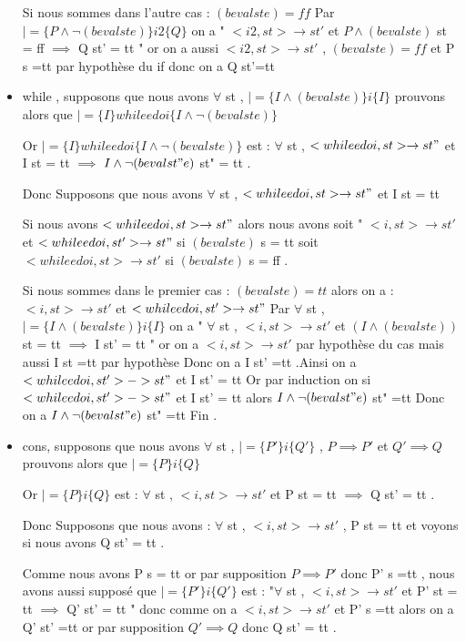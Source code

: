\documentclass{article}
\begin{document}
\begin{itemize}
Si nous sommes dans l'autre cas : $(beval st e) = ff$ 
Par $|= \{P \land \lnot(beval st e) \}i2\{Q\}$ on a  " $< i2,st > \rightarrow st' $  et $P \land (beval st e)$ st = ff $\implies$ Q st' = tt " or on a aussi $<i2 ,st > \rightarrow st' $ , $(beval st e) = ff$  et P s =tt par  hypothèse du if donc on a Q st'=tt

\item while , supposons que nous avons $\forall$ st , $|= \{I \land (beval st e) \}i\{I\}$ prouvons alors que $|= \{I\} while e do i \{ I \land \lnot (beval st e )  \} $

Or $|= \{I\}while e do i\{ I \land \lnot (beval st e ) \}$ est : $\forall$ st  , $<while e do i,st > \rightarrow st" $  et  I st = tt $\implies$ $I \land \lnot (beval st" e)$  st" = tt . 

Donc 
Supposons que nous avons $\forall$ st  , $<while e do i ,st > \rightarrow st" $  et   I st = tt 

Si nous avons $<while e do i ,st > \rightarrow st" $ alors nous avons soit " $<i ,st> \rightarrow st' $ et $<while e do i , st'> \rightarrow st" $ si $(beval st e ) $ s = tt  soit $<while e do i ,st > \rightarrow st' $ si $(beval st e ) $ s = ff .

Si nous sommes dans le premier cas : $(beval st e) = tt$ 
alors on a : $<i ,st> \rightarrow st' $ et $<while e do i , st'> \rightarrow st" $ 
Par $\forall$ st , $|= \{I \land (beval st e) \}i\{I\}$ on  a " $\forall$ st  , $< i ,st > \rightarrow st' $  et $(I \land (beval st e) )$  st = tt $\implies$ I st' = tt " or on a $<i ,st> \rightarrow st' $ par hypothèse du cas mais aussi I st =tt par hypothèse Donc on a I st' =tt .Ainsi on a $< while e do i ,st'> -> st" $ et I st' = tt 
Or par induction on si $< while e do i ,st'> -> st" $ et I st' = tt  alors  $I\land \lnot(beval st" e)$  st" =tt  Donc on a $I\land \lnot(beval st" e)$  st" =tt Fin . 

\item cons, supposons que nous avons $\forall$ st , $|= \{P'\}i\{Q'\}$ , $P \implies P'$ et $Q' \implies Q$ prouvons alors que $|= \{P\}i\{ Q\} $


Or $|= \{P\}i\{ Q\}$  est : $\forall$ st  , $<i,st > \rightarrow st' $  et P  st = tt $\implies$ Q st' = tt .

Donc 
Supposons que nous avons : $\forall$ st  , $< i,st > \rightarrow st' $  , P  st = tt  et  voyons si nous avons Q st' = tt .

Comme nous avons P s = tt or par supposition $P \implies P'$  donc P' s =tt  , nous avons aussi supposé que $|= \{P'\}i\{Q'\}$ est : "$\forall$ st  , $<i,st > \rightarrow st' $  et P'  st = tt $\implies$ Q' st' = tt " donc comme on a $<i,st > \rightarrow st' $  et P' s =tt alors on a Q' st' =tt or par supposition $Q' \implies Q$ donc Q st' = tt . 


\end{itemize}
\end{document}

